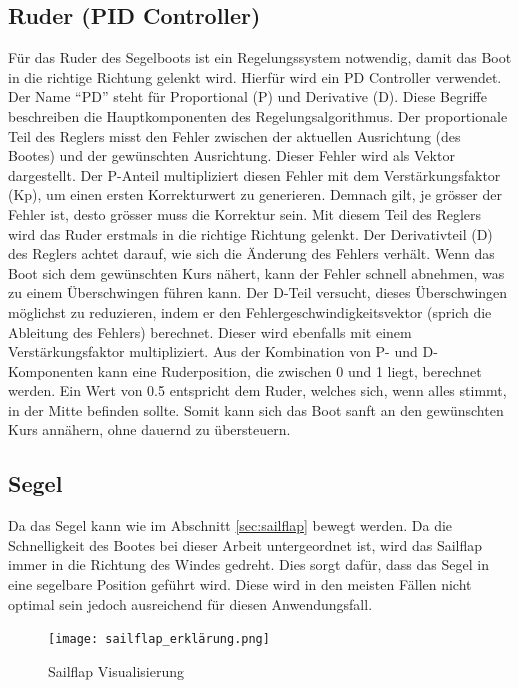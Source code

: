 \subsection{Ruder (PID Controller)}
Für das Ruder des Segelboots ist ein Regelungssystem notwendig, damit das Boot in die richtige Richtung gelenkt wird. Hierfür wird ein PD Controller verwendet. Der Name \enquote{PD} steht für Proportional (P) und Derivative (D). Diese Begriffe beschreiben die Hauptkomponenten des Regelungsalgorithmus. Der proportionale Teil des Reglers misst den Fehler zwischen der aktuellen Ausrichtung (des Bootes) und der gewünschten Ausrichtung. Dieser Fehler wird als Vektor dargestellt. Der P-Anteil multipliziert diesen Fehler mit dem Verstärkungsfaktor (Kp), um einen ersten Korrekturwert zu generieren. Demnach gilt, je grösser der Fehler ist, desto grösser muss die Korrektur sein. Mit diesem Teil des Reglers wird das Ruder erstmals in die richtige Richtung gelenkt. Der Derivativteil (D) des Reglers achtet darauf, wie sich die Änderung des Fehlers verhält. Wenn das Boot sich dem gewünschten Kurs nähert, kann der Fehler schnell abnehmen, was zu einem Überschwingen führen kann. Der D-Teil versucht, dieses Überschwingen möglichst zu reduzieren, indem er den Fehlergeschwindigkeitsvektor (sprich die Ableitung des Fehlers) berechnet. Dieser wird ebenfalls mit einem Verstärkungsfaktor multipliziert. Aus der Kombination von P- und D-Komponenten kann eine Ruderposition, die zwischen 0 und 1 liegt, berechnet werden. Ein Wert von 0.5 entspricht dem Ruder, welches sich, wenn alles stimmt, in der Mitte befinden sollte. Somit kann sich das Boot sanft an den gewünschten Kurs annähern, ohne dauernd zu übersteuern. 
\subsection{Segel}
Da das Segel kann wie im Abschnitt \ref{sec:sailflap}  bewegt werden. Da die Schnelligkeit des Bootes bei dieser Arbeit untergeordnet ist, wird das Sailflap immer in die Richtung des Windes gedreht. Dies sorgt dafür, dass das Segel in eine segelbare Position geführt wird. Diese wird in den meisten Fällen nicht optimal sein  jedoch ausreichend für diesen Anwendungsfall.
\begin{figure}
    \centering
    \texttt{[image: sailflap\_erklärung.png]}
    \caption{Sailflap Visualisierung}
    \label{fig:enter-label}
\end{figure}